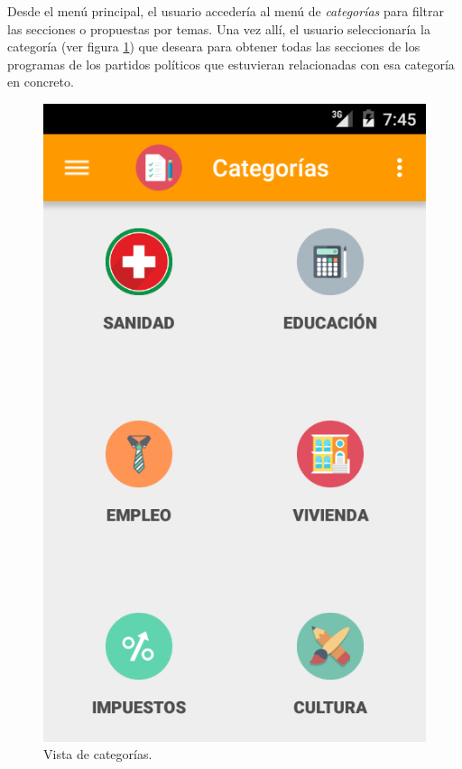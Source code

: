 \begin{enumerate}[label=\textbf{\Alph*}]
 Desde el menú principal, el usuario accedería al menú de \textit{categorías} para filtrar las secciones o propuestas por temas. Una vez allí, el usuario seleccionaría la categoría (ver figura \ref{fig:categoriesFrame}) que deseara para obtener todas las secciones de los programas de los partidos políticos que estuvieran relacionadas con esa categoría en concreto.
 
      	\begin{figure}[!]
      \centering
	\includegraphics[keepaspectratio, scale=0.3]{Media/Captures/categoriesFrame.png}
      \caption{Vista de categorías.}
      \label{fig:categoriesFrame}
    \end{figure} 
 

\end{enumerate}
